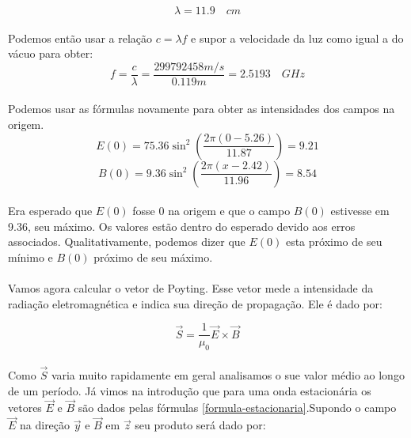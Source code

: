 \documentclass[a4paper,11pt]{article}
\begin{document}
	\begin{displaymath}
		\lambda = 11.9 \quad cm 
	\end{displaymath}
	
	\paragraph{}Podemos então usar a relação $c = \lambda f$ e supor a velocidade da luz como igual a do vácuo para obter:
	\begin{displaymath}
		f = \frac{c}{\lambda} = \frac{299792458 m/s}{0.119 m} = 2.5193 \quad GHz 
	\end{displaymath}
	
	\paragraph{}Podemos usar as fórmulas novamente para obter as intensidades dos campos na origem.
	\begin{displaymath}	
		E(0) = 75.36 \sin^2(\frac{2\pi(0 - 5.26)}{11.87}) =  9.21 
	\end{displaymath}
	\begin{displaymath}	
		B(0) = 9.36 \sin^2(\frac{2\pi(x - 2.42)}{11.96}) =   8.54	
	\end{displaymath}
	
	\paragraph{} Era esperado que $E(0)$ fosse 0 na origem e que o campo 	$B(0)$ estivesse em 9.36, seu máximo. Os valores estão dentro do esperado devido aos erros associados. Qualitativamente, podemos dizer que $E(0)$ esta próximo de seu mínimo e $B(0)$ próximo de seu máximo.  
	
	\paragraph{}Vamos agora calcular o vetor de Poyting. Esse vetor mede a intensidade da radiação eletromagnética e indica sua direção de propagação. Ele é dado por:
		
	\begin{equation}
		\vec{S} = \frac{1}{\mu_0} \vec{E} \times \vec{B}
	\end{equation}
	
	\paragraph{} Como $\vec{S}$ varia muito rapidamente em geral analisamos o sue valor médio ao longo de um período. Já vimos na introdução que para uma onda estacionária os vetores $\vec{E}$ e $\vec{B}$ são dados pelas fórmulas \ref{formula-estacionaria}.Supondo o campo $\vec{E}$ na direção $\vec{y}$ e $\vec{B}$ em $\vec{z}$ seu produto será dado por:
	
\end{document}
